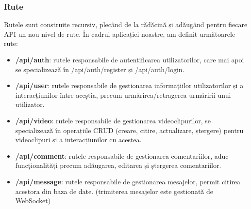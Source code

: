\subsubsection{Rute}
Rutele sunt construite recursiv, plecând de la rădăcină și adăugând pentru fiecare API 
un nou nivel de rute. În cadrul aplicației noastre, am definit următoarele rute:

\begin{itemize}
    \item \textbf{/api/auth}: rutele responsabile de autentificarea utilizatorilor, care mai apoi 
    se specializează în /api/auth/register și /api/auth/login.
    \item \textbf{/api/user}: rutele responsabile de gestionarea informațiilor utilizatorilor și a 
    interacțiunilor între aceștia, precum urmărirea/retragerea urmăririi unui utilizator.
    \item \textbf{/api/video}: rutele responsabile de gestionarea videoclipurilor, se specializează
    în operațiile CRUD (creare, citire, actualizare, ștergere) pentru videoclipuri și a interacțiunilor cu acestea.
    \item \textbf{/api/comment}: rutele responsabile de gestionarea comentariilor, aduc funcționalități
    precum adăugarea, editarea și ștergerea comentariilor.
    \item \textbf{/api/message}: rutele responsabile de gestionarea mesajelor, permit citirea acestora
    din baza de date. (trimiterea mesajelor este gestionată de WebSocket)
\end{itemize}

